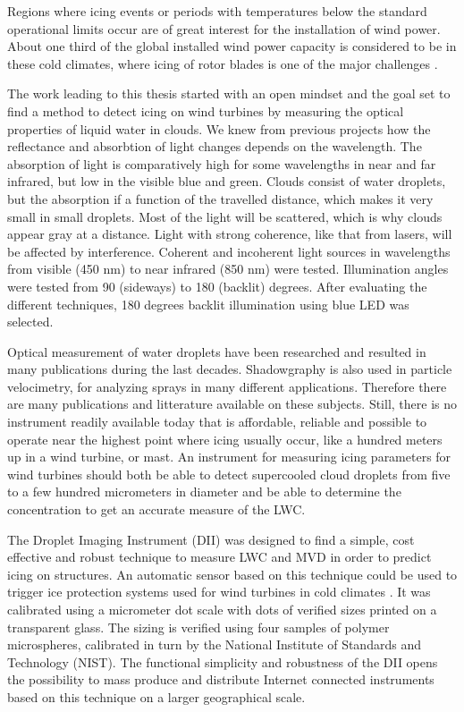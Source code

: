Regions where icing events or periods with temperatures below the standard operational limits occur are of great interest for the installation of wind power. About one third of the global installed wind power capacity is considered to be in these cold climates, where icing of rotor blades is one of the major challenges \cite{iea2017}.

The work leading to this thesis started with an open mindset and the goal set to find a method to detect icing on wind turbines by measuring the optical properties of liquid water in clouds. We knew from previous projects how the reflectance and absorbtion of light changes depends on the wavelength. The absorption of light is comparatively high for some wavelengths in near and far infrared, but low in the visible blue and green. Clouds consist of water droplets, but the absorption if a function of the travelled distance, which makes it very small in small droplets. Most of the light will be scattered, which is why clouds appear gray at a distance. Light with strong coherence, like that from lasers, will be affected by interference. Coherent and incoherent light sources in wavelengths from visible (450 nm) to near infrared (850 nm) were tested. Illumination angles were tested from 90 (sideways) to 180 (backlit) degrees. After evaluating the different techniques, 180 degrees backlit illumination using blue LED was selected.

Optical measurement of water droplets have been researched and resulted in many publications during the last decades. Shadowgraphy is also used in particle velocimetry, for analyzing sprays in many different applications. Therefore there are many publications and litterature available on these subjects. Still, there is no instrument readily available today that is affordable, reliable and possible to operate near the highest point where icing usually occur, like a hundred meters up in a wind turbine, or mast. An instrument for measuring icing parameters for wind turbines should both be able to detect supercooled cloud droplets from five to a few hundred micrometers in diameter and be able to determine the concentration to get an accurate measure of the LWC.

The Droplet Imaging Instrument (DII) was designed to find a simple, cost effective and robust technique to measure LWC and MVD in order to predict icing on structures. An automatic sensor based on this technique could be used to trigger ice protection systems used for wind turbines in cold climates \cite{lamra2013}. It was calibrated using a micrometer dot scale with dots of verified sizes printed on a transparent glass. The sizing is verified using four samples of polymer microspheres, calibrated in turn by the National Institute of Standards and Technology (NIST). The functional simplicity and robustness of the DII opens the possibility to mass produce and distribute Internet connected instruments based on this technique on a larger geographical scale.

